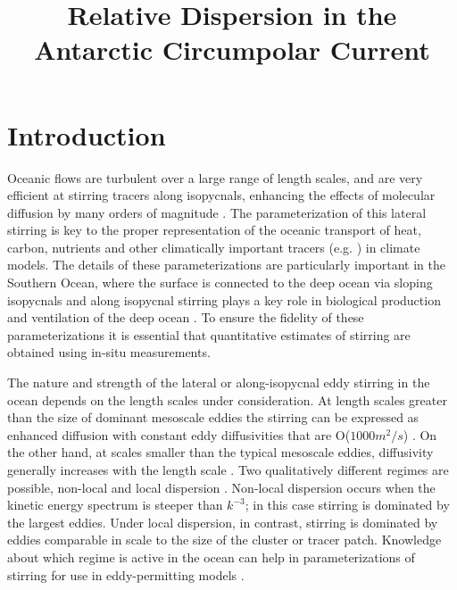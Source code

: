 \documentclass[]{ametsoc}
\title{Relative Dispersion in the Antarctic Circumpolar Current}
\affiliation{School of Oceanography, 
                 University of Washington, Seattle, Washington, USA}
\begin{document}
\maketitle

\section{Introduction}
Oceanic flows are turbulent over a large range of length scales, and are very efficient at stirring tracers along isopycnals, enhancing the effects of molecular diffusion by many orders of magnitude \citep{garrett2006turbulent}. The parameterization of this lateral stirring is key to the proper representation of the oceanic transport of heat, carbon, nutrients and other climatically important tracers (e.g. \cite{gnandesikan2015, fox2013lateral}) in climate models. The details of these parameterizations are particularly important in the Southern Ocean, where the surface is connected to the deep ocean via sloping isopycnals and along isopycnal stirring plays a key role in biological production \citep{uchida2019contribution, uchida2020vertical} and ventilation of the deep ocean \citep{marshall2012closure, abernathey2015southern, balwada2018submesoscale, jones2019isopycnal}. To ensure the fidelity of these parameterizations it is essential that quantitative estimates of stirring are obtained using in-situ measurements.

The nature and strength of the lateral or along-isopycnal eddy stirring in the ocean depends on the length scales under consideration. At length scales greater than the size of dominant mesoscale eddies the stirring can be expressed as enhanced diffusion with constant eddy diffusivities that are O($1000m^2/s$) \citep{zhurbas2003lateral, koszalka2011surface, lacasce2014, balwada2016, roach2016horizontal, roach2018global}. On the other hand, at scales smaller than the typical mesoscale eddies, diffusivity generally increases with the length scale \citep{richardson1926atmospheric, okubo1971oceanic}. Two qualitatively different regimes are possible, non-local and local dispersion \citep{bennett1984relative}. Non-local dispersion occurs when the kinetic energy spectrum is steeper than $k^{-3}$; in this case stirring is dominated by the largest eddies. Under local dispersion, in contrast, stirring is dominated by eddies comparable in scale to the size of the cluster or tracer patch. Knowledge about which regime is active in the ocean can help in parameterizations of stirring for use in eddy-permitting models \citep{cushman2008beyond, kampf2016towards}.
\end{document}
